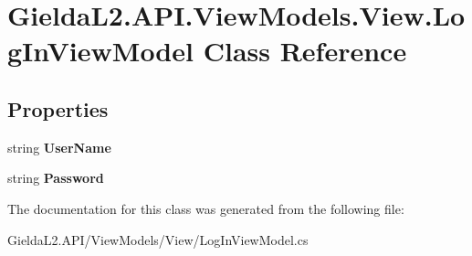 \hypertarget{class_gielda_l2_1_1_a_p_i_1_1_view_models_1_1_view_1_1_log_in_view_model}{}\section{Gielda\+L2.\+A\+P\+I.\+View\+Models.\+View.\+Log\+In\+View\+Model Class Reference}
\label{class_gielda_l2_1_1_a_p_i_1_1_view_models_1_1_view_1_1_log_in_view_model}
\subsection*{Properties}
\begin{DoxyCompactItemize}
\item 
\mbox{\label{class_gielda_l2_1_1_a_p_i_1_1_view_models_1_1_view_1_1_log_in_view_model_a9a28e07adbe2f2ba0c1f12861455049f}} 
string {\bfseries User\+Name}
\item 
\mbox{\label{class_gielda_l2_1_1_a_p_i_1_1_view_models_1_1_view_1_1_log_in_view_model_a96bd97b93d24fbae8af03caadd2ea090}} 
string {\bfseries Password}
\end{DoxyCompactItemize}


The documentation for this class was generated from the following file\+:\begin{DoxyCompactItemize}
\item 
Gielda\+L2.\+A\+P\+I/\+View\+Models/\+View/Log\+In\+View\+Model.\+cs\end{DoxyCompactItemize}

